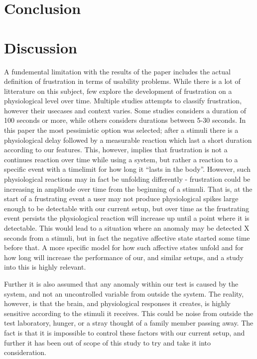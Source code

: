 
\section{Conclusion}


\section{Discussion}
A fundemental limitation with the results of the paper includes the actual definition of frustration in terms of usability problems. 
While there is a lot of litterature on this subject, few explore the development of frustration on a physiological level over time. 
Multiple studies attempts to classify frustration, however their usecases and context varies. 
Some studies considers a duration of 100 seconds or more, while others considers durations between 5-30 seconds.
In this paper the most pessimistic option was selected; after a stimuli there is a physiological delay followed by a measurable reaction which last a short duration according to our features.
This, however, implies that frustration is not a continues reaction over time while using a system, but rather a reaction to a specific event with a timelimit for how long it ``lasts in the body''.
However, such physiological reactions may in fact be unfolding differently - frustration could be increasing in amplitude over time from the beginning of a stimuli. 
That is, at the start of a frustrating event a user may not produce physiological spikes large enough to be detectable with our current setup, but over time as the frustrating event persists the physiological reaction will increase up until a point where it is detectable. 
This would lead to a situation where an anomaly may be detected X seconds from a stimuli, but in fact the negative affective state started some time before that.
A more specific model for how such affective states unfold and for how long will increase the performance of our, and similar setups, and
a study into this is highly relevant.

Further it is also assumed that any anomaly within our test is caused by the system, and not an uncontrolled variable from outside the system. 
The reality, however, is that the brain, and physiological responses it creates, is highly sensitive according to the stimuli it receives.
This could be noise from outside the test laboratory, hunger, or a stray thought of a family member passing away. 
The fact is that it is impossible to control these factors with our current setup, and further it has been out of scope of this study to try and take it into consideration.

